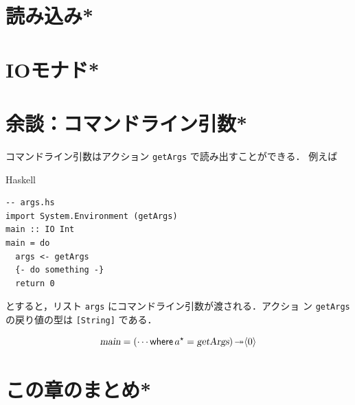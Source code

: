 \documentclass[a5paper,twoside,fleqn]{jsbook}
\newcommand{\programminglanguage}[1]{\textsf{#1}}
\newcommand{\haskell}{\programminglanguage{Haskell}}
\newcommand{\code}[1]{\texttt{#1}}
\newenvironment{haskellcode}{\begin{itembox}[r]{\haskell}}{\end{itembox}}
\newcommand{\mKeyword}[1]{\mathsf{#1}} %
\newcommand{\mWhereKeyword}{\mKeyword{where}}
\DeclareMathOperator{\mWhere}{\mWhereKeyword}
\newcommand{\mAction}[1]{\textsl{#1}}
\DeclareMathOperator{\mMain}{\mAction{main}}
\DeclareMathOperator{\mBindRightIgnore}{\twoheadrightarrow}
\newcommand{\mPureWith}[1]{\langle#1\rangle}
\newcommand{\mList}[1]{{#1}^\mathrm{\star}}
\begin{document}
\section{読み込み*}
\section{IOモナド*}

\section{余談：コマンドライン引数*}

コマンドライン引数はアクション \code{getArgs} で読み出すことができる．
例えば
\begin{haskellcode}
\begin{verbatim}
-- args.hs
import System.Environment (getArgs)
main :: IO Int
main = do
  args <- getArgs
  {- do something -}
  return 0
\end{verbatim}
\end{haskellcode}
とすると，リスト \code{args} にコマンドライン引数が渡される．アクショ
ン \code{getArgs} の戻り値の型は \code{[String]} である．

\begin{equation}
\mMain=(\dotsb\mWhere{}\mList{a}=\mAction{getArgs})\mBindRightIgnore\mPureWith{0}
\end{equation}

\section{この章のまとめ*}

\end{document}
